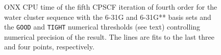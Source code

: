 \documentclass[prl,aps,preprint,showpacs,superbib]{revtex4}
\begin{document}
{\begin{figure}[h]
  \caption{\protect
    ONX CPU time of the fifth CPSCF iteration of fourth order for
    the water cluster sequence with the 6-31G and 6-31G** 
    basis sets and the {\tt GOOD} and {\tt TIGHT} 
    numerical thresholds (see text) controlling numerical
    precision of the result. The lines are fits to the 
    last three and four points, respectively.
  }\label{fig:Gamma_ONX_Timing}
\end{figure}

}
\end{document}
